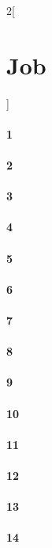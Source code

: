 \documentclass{book}
\begin{document}
\begin{multicols}{2}[\part{Job}]
\subsection*{1}
\subsection*{2}
\subsection*{3}
\subsection*{4}
\subsection*{5}
\subsection*{6}
\subsection*{7}
\subsection*{8}
\subsection*{9}
\subsection*{10}
\subsection*{11}
\subsection*{12}
\subsection*{13}
\subsection*{14}

\end{multicols}
\end{document}
